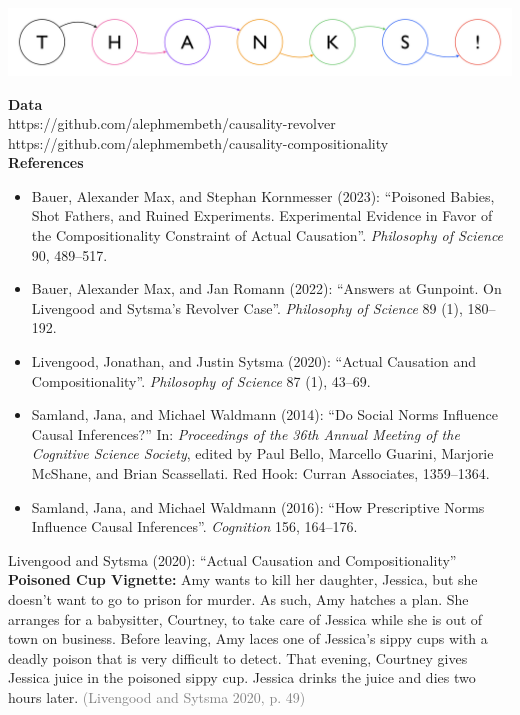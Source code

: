 \documentclass[xcolor=table,9pt,aspectratio=169]{beamer}
\begin{document}
\begin{frame}{}
\begin{center}
   {\includegraphics[width=\linewidth]{figures/thanks.pdf}}
\end{center}
\vfill
{\footnotesize
\textbf{Data}\\
https://github.com/alephmembeth/causality-revolver\\
https://github.com/alephmembeth/causality-compositionality\\
\vspace{1em}
\textbf{References}\\
\begin{itemize}[label=,leftmargin=2em,itemindent=-2em]
   \item Bauer, Alexander Max, and Stephan Kornmesser (2023): ``Poisoned Babies, Shot Fathers, and Ruined Experiments. Experimental Evidence in Favor of the Compositionality Constraint of Actual Causation''. \textit{Philosophy of Science} 90, 489--517.
   \item Bauer, Alexander Max, and Jan Romann (2022): ``Answers at Gunpoint. On Livengood and Sytsma's Revolver Case''. \textit{Philosophy of Science} 89 (1), 180--192.
   \item Livengood, Jonathan, and Justin Sytsma (2020): ``Actual Causation and Compositionality''. \textit{Philosophy of Science} 87 (1), 43--69.
   \item Samland, Jana, and Michael Waldmann (2014): ``Do Social Norms Influence Causal Inferences?'' In: \textit{Proceedings of the 36th Annual Meeting of the Cognitive Science Society}, edited by Paul Bello, Marcello Guarini, Marjorie McShane, and Brian Scassellati. Red Hook: Curran Associates, 1359--1364.
   \item Samland, Jana, and Michael Waldmann (2016): ``How Prescriptive Norms Influence Causal Inferences''. \textit{Cognition} 156, 164--176.
\end{itemize}
}
\end{frame}


\begin{frame}{\vspace*{10mm}Livengood and Sytsma (2020): ``Actual Causation and Compositionality''}
\vspace*{-5mm}
\textbf{Poisoned Cup Vignette:} Amy wants to kill her daughter, Jessica, but she doesn't want to go to prison for murder. As such, Amy hatches a plan. She arranges for a babysitter, Courtney, to take care of Jessica while she is out of town on business. Before leaving, Amy laces one of Jessica's sippy cups with a deadly poison that is very difficult to detect. That evening, Courtney gives Jessica juice in the poisoned sippy cup. Jessica drinks the juice and dies two hours later. \textcolor{gray}{(Livengood and Sytsma 2020, p. 49)}
\end{frame}
\end{document}
